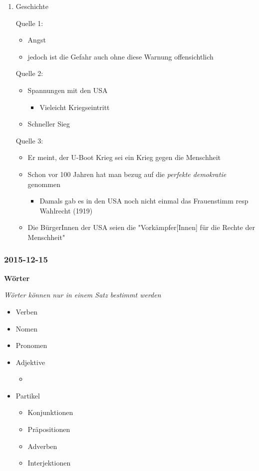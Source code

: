\documentclass[11pt]{article}
\begin{document}
\begin{enumerate}
\item Geschichte
\label{sec-1-2-10-6}

Quelle 1:
\begin{itemize}
\item Angst
\item jedoch ist die Gefahr auch ohne diese Warnung offensichtlich
\end{itemize}

Quelle 2:
\begin{itemize}
\item Spannungen mit den USA
\begin{itemize}
\item Vieleicht Kriegseintritt
\end{itemize}
\item Schneller Sieg
\end{itemize}

Quelle 3:
\begin{itemize}
\item Er meint, der U-Boot Krieg sei ein Krieg gegen die Menschheit
\item Schon vor 100 Jahren hat man bezug auf die \emph{perfekte demokratie} genommen
\begin{itemize}
\item Damals gab es in den USA noch nicht einmal das Frauenstimm resp Wahlrecht (1919)
\end{itemize}
\item Die BürgerInnen der USA seien die "Vorkämpfer[Innen] für die Rechte der Menschheit"
\end{itemize}
\end{enumerate}

\subsubsection{2015-12-15}
\label{sec-1-2-11}

\textbf{Wörter}

\emph{Wörter können nur in einem Satz bestimmt werden}

\begin{itemize}
\item Verben
\item Nomen
\item Pronomen
\item Adjektive
\begin{itemize}
\item 
\end{itemize}
\item Partikel
\begin{itemize}
\item Konjunktionen
\item Präpositionen
\item Adverben
\item Interjektionen
\end{itemize}
\end{itemize}
\end{document}

